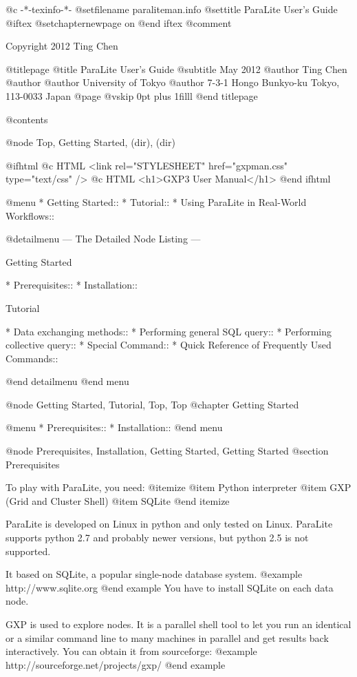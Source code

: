   @c -*-texinfo-*-
@setfilename paraliteman.info
@settitle ParaLite User's Guide
@iftex
@setchapternewpage on
@end iftex
@comment %

Copyright 2012 Ting Chen

@titlepage
@title ParaLite User's Guide
@subtitle May 2012
@author Ting Chen
@author
@author University of Tokyo
@author 7-3-1 Hongo Bunkyo-ku Tokyo, 113-0033 Japan
@page
@vskip 0pt plus 1filll
@end titlepage

@contents

@node Top, Getting Started, (dir), (dir)

@ifhtml
@c HTML <link rel="STYLESHEET" href="gxpman.css" type="text/css" />
@c HTML <h1>GXP3 User Manual</h1>
@end ifhtml

@menu
* Getting Started::             
* Tutorial::                    
* Using ParaLite in Real-World Workflows::  

@detailmenu
 --- The Detailed Node Listing ---

Getting Started

* Prerequisites::
* Installation::                

Tutorial

* Data exchanging methods::
* Performing general SQL query::   
* Performing collective query::  
* Special Command::
* Quick Reference of Frequently Used Commands::  

@end detailmenu
@end menu

@node Getting Started, Tutorial, Top, Top
@chapter Getting Started


@menu
* Prerequisites::               
* Installation::                
@end menu

@node Prerequisites, Installation, Getting Started, Getting Started
@section Prerequisites

To play with ParaLite, you need:
@itemize
@item Python interpreter
@item GXP (Grid and Cluster Shell)
@item SQLite
@end itemize

ParaLite is developed on Linux in python and only tested on Linux. ParaLite supports python 2.7 and probably newer versions, but python 2.5 is 
not supported.

It based on SQLite, a popular single-node database system. 
@example
    http://www.sqlite.org
@end example
You have to install SQLite on each data node.

GXP is used to explore nodes. It is a parallel shell tool to let you 
run an identical or a similar command line to many machines in parallel 
and get results back interactively. You can obtain it from sourceforge:
@example
    http://sourceforge.net/projects/gxp/
@end example


